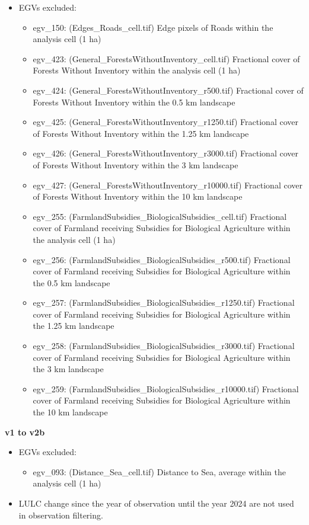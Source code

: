 \documentclass[
  openany]{book}
\providecommand{\tightlist}{%
  \setlength{\itemsep}{0pt}\setlength{\parskip}{0pt}}
\providecommand{\tightlist}{%
  \setlength{\itemsep}{0pt}%
  \setlength{\parskip}{0pt}%
}
\begin{document}
\begin{itemize}
\item
  EGVs excluded:

  \begin{itemize}
  \item
    egv\_150: (Edges\_Roads\_cell.tif) Edge pixels of Roads within the analysis cell (1 ha)
  \item
    egv\_423: (General\_ForestsWithoutInventory\_cell.tif) Fractional cover of Forests Without Inventory within the analysis cell (1 ha)
  \item
    egv\_424: (General\_ForestsWithoutInventory\_r500.tif) Fractional cover of Forests Without Inventory within the 0.5 km landscape
  \item
    egv\_425: (General\_ForestsWithoutInventory\_r1250.tif) Fractional cover of Forests Without Inventory within the 1.25 km landscape
  \item
    egv\_426: (General\_ForestsWithoutInventory\_r3000.tif) Fractional cover of Forests Without Inventory within the 3 km landscape
  \item
    egv\_427: (General\_ForestsWithoutInventory\_r10000.tif) Fractional cover of Forests Without Inventory within the 10 km landscape
  \item
    egv\_255: (FarmlandSubsidies\_BiologicalSubsidies\_cell.tif) Fractional cover of Farmland receiving Subsidies for Biological Agriculture within the analysis cell (1 ha)
  \item
    egv\_256: (FarmlandSubsidies\_BiologicalSubsidies\_r500.tif) Fractional cover of Farmland receiving Subsidies for Biological Agriculture within the 0.5 km landscape
  \item
    egv\_257: (FarmlandSubsidies\_BiologicalSubsidies\_r1250.tif) Fractional cover of Farmland receiving Subsidies for Biological Agriculture within the 1.25 km landscape
  \item
    egv\_258: (FarmlandSubsidies\_BiologicalSubsidies\_r3000.tif) Fractional cover of Farmland receiving Subsidies for Biological Agriculture within the 3 km landscape
  \item
    egv\_259: (FarmlandSubsidies\_BiologicalSubsidies\_r10000.tif) Fractional cover of Farmland receiving Subsidies for Biological Agriculture within the 10 km landscape
  \end{itemize}
\end{itemize}

\textbf{v1 to v2b}

\begin{itemize}
\item
  EGVs excluded:

  \begin{itemize}
  \tightlist
  \item
    egv\_093: (Distance\_Sea\_cell.tif) Distance to Sea, average within the analysis cell (1 ha)
  \end{itemize}
\item
  LULC change since the year of observation until the year 2024 are not used in
  observation filtering.
\end{itemize}
\end{document}
